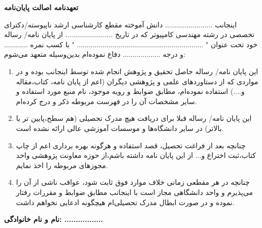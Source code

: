 \thispagestyle{empty}
\noindent

\textbf{\Large تعهدنامه اصالت  پایان‌نامه}
\vskip 1cm

اینجانب ........................ دانش آموخته مقطع کارشناسی ارشد ناپیوسته/دکترای تخصصی در رشته مهندسی کامپیوتر که در تاریخ ........................ از پایان نامه/ رساله خود تحت عنوان " ................................................................ " با کسب نمره ............ و درجه ................... دفاع نموده‌ام بدین‌وسیله متعهد می‌شوم:
\begin{enumerate}
	\item این پایان نامه/ رساله حاصل تحقیق و پژوهش انجام شده توسط اینجانب بوده و در مواردی که از دستاوردهای علمی و پژوهشی دیگران (اعم از پایان نامه، کتاب،مقاله و....) استفاده نموده‌ام، مطابق ضوابط و رویه موجود، نام منبع مورد استفاده و سایر مشخصات آن را در فهرست مربوطه ذکر و درج کرده‌ام.
	\item این پایان نامه/ رساله قبلا برای دریافت هیچ مدرک تحصیلی (هم سطح،پایین تر یا بالاتر) در سایر دانشگاه‌ها و موسسات آموزشی عالی ارائه نشده است.
	\item 	چنانچه بعد از فراغت تحصیل، قصد استفاده و هرگونه بهره برداری اعم از چاپ کتاب،ثبت اختراع و... از این پایان نامه داشته باشم،از حوزه معاونت پژوهشی واحد مجوزهای مربوطه را اخذ نمایم.
	\item 	چنانچه در هر مقطعی زمانی خلاف موارد فوق ثابت شود، عواقب ناشی از آن را می‌پذیرم و واحد دانشگاهی مجاز است با اینجانب مطابق ضوابط و مقررات رفتار نموده و در صورت ابطال مدرک تحصیلی‌ام هیچگونه ادعایی نخواهم داشت.
\end{enumerate}

\vskip 0.5cm
\begin{flushleft}
\textbf{نام و نام خانوادگی: .................}
\end{flushleft}